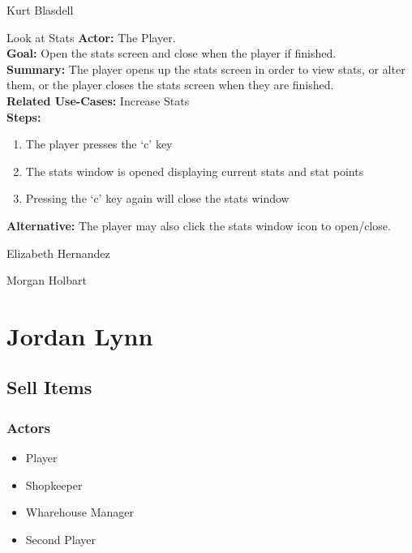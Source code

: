 \documentclass[12pt]{report}
\begin{document}
\begin{section}{Kurt Blasdell}
\begin{subsection}{Look at Stats}
\textbf{Actor:} The Player. \\
\textbf{Goal:} Open the stats screen and close when the player if finished. \\
\textbf{Summary:} The player opens up the stats screen in order to view stats, or alter them, or the player closes the stats screen when they are finished. \\
\textbf{Related Use-Cases:} Increase Stats \\
\textbf{Steps:}
\begin{enumerate}
	\item The player presses the ‘c’ key
	\item The stats window is opened displaying current stats and stat points
	\item Pressing the ‘c’ key again will close the stats window
\end{enumerate}
\textbf{Alternative:} The player may also click the stats window icon to open/close.
\end{subsection}

\end{section}



\begin{section}{Elizabeth Hernandez}
\end{section}



\begin{section}{Morgan Holbart}
\end{section}



\section{Jordan Lynn}
    \subsection{Sell Items}
    
    \subsubsection{Actors}
    \begin{itemize}
        \item Player
        \item Shopkeeper
        \item Wharehouse Manager
        \item Second Player
    \end{itemize}
\end{document}
